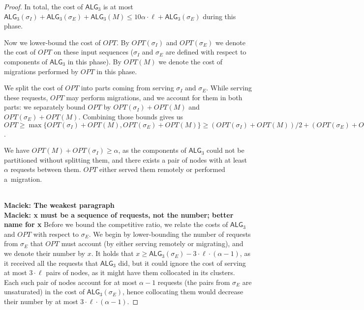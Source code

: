 \documentclass[manuscript,screen=true]{acmart}
\newcommand{\OPT}{\mathit{OPT}}
\newcommand{\TAlg}{{\ensuremath{\textsf{ALG}_{3}}}\xspace} %
\newcommand\maciek[1]{\color{brown}\textbf{\\ Maciek: #1}\color{black}}
\begin{document}
\begin{proof}

  In total, the cost of \TAlg is at most $\TAlg(\sigma_I) + \TAlg(\sigma_E) + \TAlg(M) \leq 10\alpha\cdot \ell + \TAlg(\sigma_E)$ during this phase.

  \medskip

  Now we lower-bound the cost of $\OPT$.
  By $\OPT(\sigma_I)$ and $\OPT(\sigma_E)$ we denote the cost of $\OPT$ on these input sequences ($\sigma_I$ and $\sigma_E$ are defined with respect to components of \TAlg in this phase).
  By $\OPT(M)$ we denote the cost of migrations performed by $\OPT$ in this phase.
  
  We split the cost of $\OPT$ into parts coming from serving $\sigma_I$ and $\sigma_E$.
  While serving these requests, $\OPT$ may perform migrations, and we account for them in both parts: we separately bound $\OPT$ by $\OPT(\sigma_I) + \OPT(M)$ and $\OPT(\sigma_E) + \OPT(M)$.
  Combining those bounds gives us $\OPT \geq \max\{\OPT(\sigma_I) + \OPT(M), \OPT(\sigma_E) + \OPT(M)\} \geq (\OPT(\sigma_I) + \OPT(M)) / 2 + (\OPT(\sigma_E) + \OPT(M)) / 2$.


  We have $OPT(M) + OPT(\sigma_I) \geq \alpha$, as the components of \TAlg{} could not be partitioned without splitting them, and there exists a pair of nodes with at least $\alpha$ requests between them.
  $\OPT$ either served them remotely or performed a~migration.

  \medskip
  \maciek{The weakest paragraph}
  \maciek{x must be a sequence of requests, not the number; better name for x}
  Before we bound the competitive ratio, we relate the costs of $\TAlg$ and $\OPT$ with respect to $\sigma_E$.
  We begin by lower-bounding the number of requests from $\sigma_E$ that $\OPT$ must account (by either serving remotely or migrating), and we denote their number by $x$.
  It holds that $x \geq \TAlg(\sigma_E) - 3\cdot\ell\cdot(\alpha - 1)$, as it received all the requests that \TAlg did, but it could ignore the cost of serving at most $3\cdot\ell$ pairs of nodes, as it might have them collocated in its clusters.
  Each such pair of nodes account for at most $\alpha-1$ requests (the pairs from $\sigma_E$ are unsaturated) in the cost of $\TAlg(\sigma_E)$, hence collocating them would decrease their number by at most $3\cdot\ell\cdot(\alpha - 1)$.


\end{proof}
\end{document}
